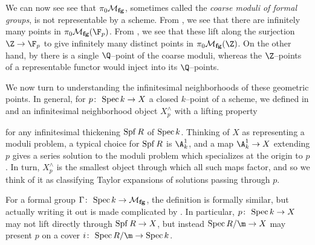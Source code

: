 \begin{remark}
We can now see see that $\pi_0 \mathcal{M}_{\mathbf{fg}}$, sometimes called the \textit{coarse moduli of formal groups}, is not representable by a scheme.  From , we see that there are infinitely many points in $\pi_0 \moduli{fg}(\F_p)$.  From , we see that these lift along the surjection $\Z \to \F_p$ to give infinitely many distinct points in $\pi_0 \moduli{fg}(\Z)$.  On the other hand, by  there is a single $\Q$--point of the coarse moduli, whereas the $\Z$--points of a representable functor would inject into its $\Q$--points.
\end{remark}

We now turn to understanding the infinitesimal neighborhoods of these geometric points.  In general, for $p\colon\thinspace \operatorname{Spec} k \to X$ a closed $k$--point of a scheme, we defined in  and  an infinitesimal neighborhood object $X^\wedge_p$ with a lifting property
\begin{center}
\end{center}
for any infinitesimal thickening $\operatorname{Spf} R$ of $\operatorname{Spec} k$.  Thinking of $X$ as representing a moduli problem, a typical choice for $\operatorname{Spf} R$ is $\A^1_k$, and a map $\A^1_k \to X$ extending $p$ gives a series solution to the moduli problem which specializes at the origin to $p$.  In turn, $X^\wedge_p$ is the smallest object through which all such maps factor, and so we think of it as classifying Taylor expansions of solutions passing through $p$.

For a formal group $\Gamma\colon\thinspace \operatorname{Spec} k \to \mathcal{M}_{\mathbf{fg}}$, the definition is formally similar, but actually writing it out is made complicated by .  In particular, $p\colon\thinspace \operatorname{Spec} k \to X$ may not lift directly through $\operatorname{Spf} R \to X$, but instead $\Spec R/\m \to X$ may present $p$ on a cover $i\co \Spec R/\m \to \Spec k$.

